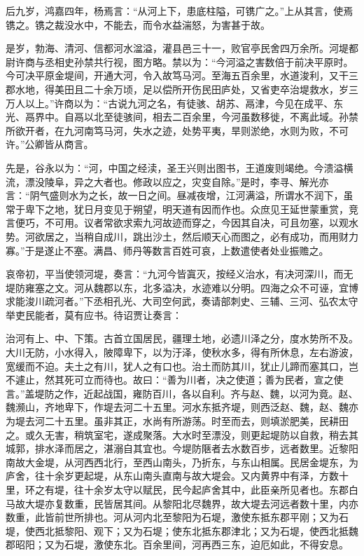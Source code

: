 \documentclass[]{article}
\begin{document}
后九岁，鸿嘉四年，杨焉言：``从河上下，患底柱隘，可镌广之。''上从其言，使焉镌之。镌之裁没水中，不能去，而令水益湍怒，为害甚于故。

是岁，勃海、清河、信都河水湓溢，灌县邑三十一，败官亭民舍四万余所。河堤都尉许商与丞相史孙禁共行视，图方略。禁以为：``今河溢之害数倍于前决平原时。今可决平原金堤间，开通大河，令入故笃马河。至海五百余里，水道浚利，又干三郡水地，得美田且二十余万顷，足以偿所开伤民田庐处，又省吏卒治堤救水，岁三万人以上。''许商以为：``古说九河之名，有徒骇、胡苏、鬲津，今见在成平、东光、鬲界中。自鬲以北至徒骇间，相去二百余里，今河虽数移徙，不离此域。孙禁所欲开者，在九河南笃马河，失水之迹，处势平夷，旱则淤绝，水则为败，不可许。''公卿皆从商言。

先是，谷永以为：``河，中国之经渎，圣王兴则出图书，王道废则竭绝。今溃溢横流，漂没陵阜，异之大者也。修政以应之，灾变自除。''是时，李寻、解光亦言：``阴气盛则水为之长，故一日之间。昼减夜增，江河满溢，所谓水不润下，虽常于卑下之地，犹日月变见于朔望，明天道有因而作也。众庶见王延世蒙重赏，竞言便巧，不可用。议者常欲求索九河故迹而穿之，今因其自决，可且勿塞，以观水势。河欲居之，当稍自成川，跳出沙土，然后顺天心而图之，必有成功，而用财力寡。''于是遂止不塞。满昌、师丹等数言百姓可哀，上数遣使者处业振赡之。

哀帝初，平当使领河堤，奏言：``九河今皆寘灭，按经义治水，有决河深川，而无堤防雍塞之文。河从魏郡以东，北多溢决，水迹难以分明。四海之众不可诬，宜博求能浚川疏河者。''下丞相孔光、大司空何武，奏请部刺史、三辅、三河、弘农太守举吏民能者，莫有应书。待诏贾让奏言：

治河有上、中、下策。古首立国居民，疆理土地，必遗川泽之分，度水势所不及。大川无防，小水得入，陂障卑下，以为汙泽，使秋水多，得有所休息，左右游波，宽缓而不迫。夫土之有川，犹人之有口也。治土而防其川，犹止儿蹄而塞其口，岂不遽止，然其死可立而待也。故曰：``善为川者，决之使道；善为民者，宣之使言。''盖堤防之作，近起战国，雍防百川，各以自利。齐与赵、魏，以河为竟。赵、魏濒山，齐地卑下，作堤去河二十五里。河水东抵齐堤，则西泛赵、魏，赵、魏亦为堤去河二十五里。虽非其正，水尚有所游荡。时至而去，则填淤肥美，民耕田之。或久无害，稍筑室宅，遂成聚落。大水时至漂没，则更起堤防以自救，稍去其城郭，排水泽而居之，湛溺自其宜也。今堤防陿者去水数百步，远者数里。近黎阳南故大金堤，从河西西北行，至西山南头，乃折东，与东山相属。民居金堤东，为庐舍，往十余岁更起堤，从东山南头直南与故大堤会。又内黄界中有泽，方数十里，环之有堤，往十余岁太守以赋民，民今起庐舍其中，此臣亲所见者也。东郡白马故大堤亦复数重，民皆居其间。从黎阳北尽魏界，故大堤去河远者数十里，内亦数重，此皆前世所排也。河从河内北至黎阳为石堤，激使东抵东郡平刚；又为石堤，使西北抵黎阳、观下；又为石堤；使东北抵东郡津北；又为石堤，使西北抵魏郡昭阳；又为石堤，激使东北。百余里间，河再西三东，迫厄如此，不得安息。
\end{document}
